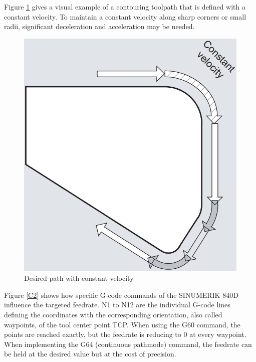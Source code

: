 Figure \ref{C1} gives a visual example of a contouring toolpath that is defined with a constant velocity. To maintain a constant velocity along sharp corners or small radii, significant deceleration and acceleration may be needed. 


 \begin{figure}[H]
 	\centerline{\includegraphics[scale=.3]{figures/conti.png}}
 	\caption{Desired path with constant velocity~\cite{sinumericmanual}}
 	\label{C1}
 \end{figure}

\newpage
Figure \ref{C2} shows how specific G-code commands of the SINUMERIK 840D influence the targeted feedrate. N1 to N12 are the individual G-code lines defining the coordinates with the corresponding orientation, also called waypoints, of the tool center point \acrshort{TCP}.  When using the G60 command, the points are reached exactly, but the feedrate is reducing to 0 at every waypoint. When implementing the G64 (continuous pathmode) command, the feedrate can be held at the desired value but at the cost of precision.
 
